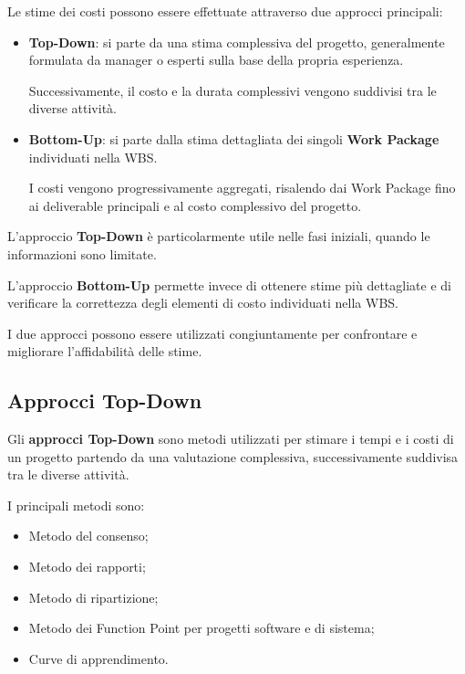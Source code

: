 \noindent Le stime dei costi possono essere effettuate
attraverso due approcci principali:

\begin{itemize}
    \item \textbf{Top-Down}: si parte da una stima complessiva
    del progetto, generalmente formulata da manager
    o esperti sulla base della propria esperienza.

    \noindent Successivamente, il costo e la durata complessivi
    vengono suddivisi tra le diverse attività.

    \item \textbf{Bottom-Up}: si parte dalla stima dettagliata
    dei singoli \textbf{Work Package} individuati nella WBS.

    \noindent I costi vengono progressivamente aggregati,
    risalendo dai Work Package fino ai deliverable principali
    e al costo complessivo del progetto.
\end{itemize}

\noindent L'approccio \textbf{Top-Down} è particolarmente utile
nelle fasi iniziali, quando le informazioni sono limitate.

\medskip

\noindent L'approccio \textbf{Bottom-Up} permette invece
di ottenere stime più dettagliate e di verificare
la correttezza degli elementi di costo individuati
nella WBS.

\medskip

\noindent I due approcci possono essere utilizzati
congiuntamente per confrontare e migliorare
l'affidabilità delle stime.

\subsection{Approcci Top-Down}

\noindent Gli \textbf{approcci Top-Down} sono metodi utilizzati
per stimare i tempi e i costi di un progetto partendo
da una valutazione complessiva, successivamente
suddivisa tra le diverse attività.

\medskip

\noindent I principali metodi sono:

\begin{itemize}
    \item Metodo del consenso;
    \item Metodo dei rapporti;
    \item Metodo di ripartizione;
    \item Metodo dei Function Point per progetti software e di sistema;
    \item Curve di apprendimento.
\end{itemize}


